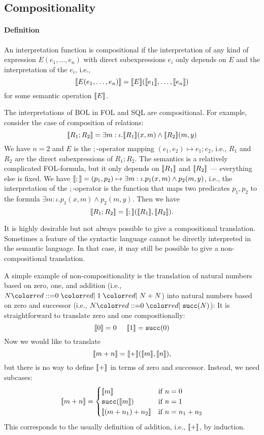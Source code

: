 \subsection{Compositionality}\label{sec:compositionality}

\paragraph{Definition}
An interpretation function is compositional if the interpretation of any kind of expression $E(e_1,\ldots,e_n)$ with direct subexpressions $e_i$ only depends on $E$ and the interpretation of the $e_i$, i.e., \[\llbracket E(e_1,\ldots,e_n)\rrbracket=\llbracket E\rrbracket(\llbracket e_1\rrbracket,\ldots,\llbracket e_n\rrbracket)\] for some semantic operation $\llbracket E\rrbracket$.

The interpretations of BOL in FOL and SQL are compositional.
For example, consider the case of composition of relations:
 \[\llbracket R_1 ; R_2\rrbracket= \exists m:\iota.\llbracket R_1\rrbracket(x,m)\wedge \llbracket R_2\rrbracket(m,y)\]
We have $n=2$ and $E$ is the $;$-operator mapping $(e_1,e_2)\mapsto e_1;e_2$, i.e., $R_1$ and $R_2$ are the direct subexpressions of $R_1;R_2$.
The semantics is a relatively complicated FOL-formula, but it only depends on $\llbracket R_1\rrbracket$ and $\llbracket R_2\rrbracket$ --- everything else is fixed.
We have $\llbracket ;\rrbracket=(p_1,p_2)\mapsto \exists m:\iota.p_1(x,m)\wedge p_2(m,y)$, i.e., the interpretation of the $;$-operator is the function that maps two predicates $p_1,p_2$ to the formula $\exists m:\iota.p_1(x,m)\wedge p_2(m,y)$.
Then we have \[\llbracket R_1;R_2\rrbracket=\llbracket ;\rrbracket(\llbracket R_1\rrbracket,\llbracket R_2\rrbracket).\]


It is highly desirable but not always possible to give a compositional translation.
Sometimes a feature of the syntactic language cannot be directly interpreted in the semantic language.
In that case, it may still be possible to give a non-compositional translation.

\begin{example}
A simple example of non-compositionality is the translation of natural numbers based on zero, one, and addition (i.e., $N\bbc 0\bnfalt 1\bnfalt N+N$) into natural numbers based on zero and successor (i.e., $N\bbc 0\bnfalt\cn{succ}(N)$):
It is straightforward to translate zero and one compositionally:
\[\llbracket 0\rrbracket=0 \hspace*{.5cm}\llbracket 1\rrbracket=\mathtt{succ}(0)\]
Now we would like to translate \[\llbracket m+n\rrbracket=\llbracket +\rrbracket(\llbracket m\rrbracket,\llbracket n\rrbracket),\] but there is no way to define $\llbracket +\rrbracket$ in terms of zero and successor.
Instead, we need subcases:
\[\llbracket m+n\rrbracket=\begin{cases}\llbracket m\rrbracket&\mathrm{if}\; n=0 \\ \mathtt{succ}(\llbracket m\rrbracket)&\mathrm{if}\; n=1 \\ \llbracket (m+n_1)+n_2\rrbracket&\mathrm{if}\; n=n_1+n_2\end{cases}\]
This corresponds to the usually definition of addition, i.e., $\llbracket +\rrbracket$, by induction.
\end{example}

